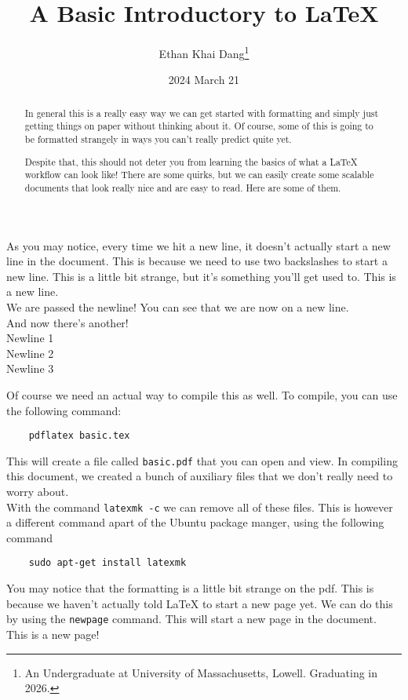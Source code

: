 \documentclass[10pt]{article}
\title{A Basic Introductory to LaTeX}
\author{Ethan Khai Dang\thanks{An Undergraduate at University of Massachusetts, Lowell. Graduating in 2026.}}
\date{2024 March 21}
\begin{document}
\maketitle
\thispagestyle{empty} %
\newpage

\begin{abstract}
In general this is a really easy way we can get started with formatting and simply just getting things on paper without thinking about it.
Of course, some of this is going to be formatted strangely in ways you can't really predict quite yet.

Despite that, this should not deter you from learning the basics of what a LaTeX workflow can look like! There are some quirks,
but we can easily create some scalable documents that look really nice and are easy to read. Here are some of them.
\end{abstract}


As you may notice, every time we hit a new line, it doesn't actually start a new line in the document. This is because we need to use two backslashes to start a new line. This is a little bit strange, but it's something you'll get used to.
This is a new line.\\We are passed the newline! You can see that we are now on a new line.\\And now there's another!
\\Newline 1\\Newline 2\\Newline 3

Of course we need an actual way to compile this as well. To compile, you can use the following command:
\begin{verbatim}
    pdflatex basic.tex
\end{verbatim}
This will create a file called \texttt{basic.pdf} that you can open and view. In compiling this document, we created a bunch of auxiliary files that we don't really need to worry about.\\
With the command \texttt{latexmk -c} we can remove all of these files. This is however a different command apart of the Ubuntu package manger, using the following command
\begin{verbatim}
    sudo apt-get install latexmk
\end{verbatim}

You may notice that the formatting is a little bit strange on the pdf. This is because we haven't actually told LaTeX to start a new page yet. We can do this by using the \texttt{newpage} command. This will start a new page in the document.\\
\newpage
This is a new page!\\
\newpage
\end{document}
